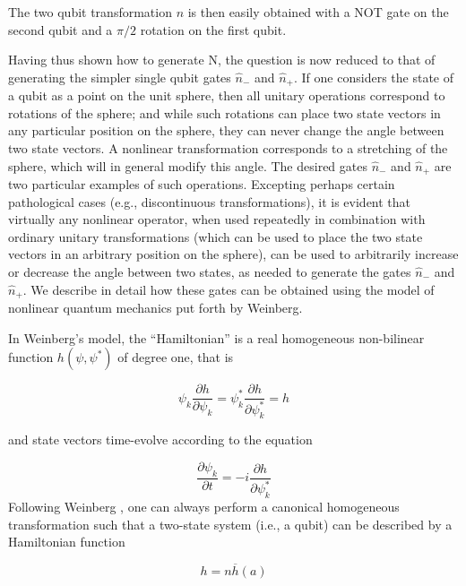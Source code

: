 \documentclass[12pt]{article}
\begin{document}
The two qubit transformation $n$ is then easily obtained with a NOT gate on the
second qubit and a $\pi/2$ rotation on the first qubit.\ 

Having thus shown how to generate N, the question is now reduced to that of
generating the simpler single qubit gates $\widehat{n}_{-}$ and $\widehat
{n}_{+}$. If one considers the state of a qubit as a point on the unit sphere,
then all unitary operations correspond to rotations of the sphere; and while
such rotations can place two state vectors in any particular position on the
sphere, they can never change the angle between two state vectors. A nonlinear
transformation corresponds to a stretching of the sphere, which will in
general modify this angle. The desired gates $\widehat{n}_{-}$ and
$\widehat{n}_{+}$ are two particular examples of such operations. Excepting
perhaps certain pathological cases (e.g., discontinuous transformations), it
is evident that virtually any nonlinear operator, when used repeatedly in
combination with ordinary unitary transformations (which can be used to place
the two state vectors in an arbitrary position on the sphere), can be used to
arbitrarily increase or decrease the angle between two states, as needed to
generate the gates $\widehat{n}_{-}$ and $\widehat{n}_{+}$. We describe in
detail how these gates can be obtained using the model of nonlinear quantum
mechanics put forth by Weinberg.

In Weinberg's model, the ``Hamiltonian'' is a real homogeneous non-bilinear
function $h(\psi,\psi^{*})$ of degree one, that is \cite{Weinberg 2}%

\begin{equation}
\psi_{k}\frac{\partial h}{\partial\psi_{k}}=\psi_{k}^{*}\frac{\partial
h}{\partial\psi_{k}^{*}}=h
\end{equation}

and state vectors time-evolve according to the equation%

\begin{equation}
\frac{\partial\psi_{k}}{\partial t}=-i\frac{\partial h}{\partial\psi_{k}^{*}}
\label{SE}%
\end{equation}
Following Weinberg \cite{Weinberg 2}, one can always perform a canonical
homogeneous transformation such that a two-state system (i.e., a qubit) can be
described by a Hamiltonian function%

\begin{equation}
h=n\overline{h}(a)
\end{equation}
\end{document}
